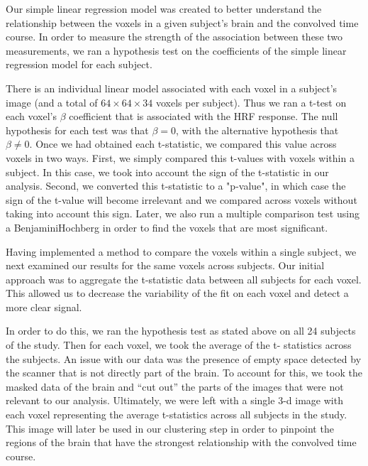 \par \indent Our simple linear regression model was created to better 
understand the relationship between the voxels in a given subject's brain and 
the convolved time course. In order to measure the strength of the association 
between these two measurements, we ran a hypothesis test on the coefficients of 
the simple linear regression model for each subject. 

\par There is an individual linear model associated with each voxel in a
subject’s image (and a total of $64 \times 64 \times 34$ voxels per subject).
Thus we ran a t-test on each voxel's $\beta$ coefficient that is associated
with the HRF response. The null hypothesis for each test was that $ \beta = 0$,
with the alternative hypothesis that $\beta \neq 0$. Once we had obtained each
t-statistic, we compared this value across voxels in two ways. First, we simply
compared this t-values with voxels within a subject. In this case, we took into
account the sign of the t-statistic in our analysis. Second, we converted this
t-statistic to a "p-value", in which case the sign of the t-value will become
irrelevant and we compared across voxels without taking into account this sign.
Later, we also run a multiple comparison test using a Benjamini\–Hochberg in
order to find the voxels that are most significant.


\par Having implemented a method to compare the voxels within a single subject, 
we next examined our results for the same voxels across subjects. Our initial 
approach was to aggregate the t-statistic data between all subjects for each 
voxel. This allowed us to decrease the variability of the fit on each voxel and 
detect a more clear signal. 

\par In order to do this, we ran the hypothesis test as stated above on all 24 
subjects of the study. Then for each voxel, we took the average of the t-
statistics across the subjects. An issue with our data was the presence of 
empty space detected by the scanner that is not directly part of the brain. To 
account for this, we took the masked data of the brain and ``cut out'' the parts 
of the images that were not relevant to our analysis. Ultimately, we were left with 
a single 3-d image with each voxel representing the average t-statistics across 
all subjects in the study. This image will later be used in our clustering step in 
order to pinpoint the regions of the brain that have the strongest relationship 
with the convolved time course. 
